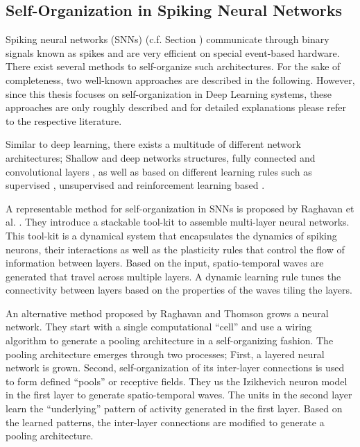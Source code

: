 \subsection{Self-Organization in Spiking Neural Networks}
Spiking neural networks (SNNs) (c.f. Section ) communicate through binary signals known as spikes and are very efficient on special event-based hardware.
There exist several methods to self-organize such architectures.
For the sake of completeness, two well-known approaches are described in the following.
However, since this thesis focuses on self-organization in Deep Learning systems, these approaches are only roughly described and for detailed explanations please refer to the respective literature.

Similar to deep learning, there exists a multitude of different network architectures; Shallow  and deep networks  structures, fully connected  and convolutional layers , as well as based on different learning rules such as supervised , unsupervised  and reinforcement learning based .

A representable method for self-organization in SNNs is proposed by Raghavan et al. .
They introduce a stackable tool-kit to assemble multi-layer neural networks.
This tool-kit is a dynamical system that encapsulates the dynamics of spiking neurons, their interactions as well as the plasticity rules that control the flow of information between layers.
Based on the input, spatio-temporal waves are generated that travel across multiple layers.
A dynamic learning rule tunes the connectivity between layers based on the properties of the waves tiling the layers.

An alternative method proposed by Raghavan and Thomson  grows a neural network.
They start with a single computational ``cell'' and use a wiring algorithm to generate a pooling architecture in a self-organizing fashion.
The pooling architecture emerges through two processes; First, a layered neural network is grown. Second, self-organization of its inter-layer connections is used to form defined ``pools'' or receptive fields.
They us the Izikhevich neuron model  in the first layer to generate spatio-temporal waves.
The units in the second layer learn the ``underlying'' pattern of activity generated in the first layer. 
Based on the learned patterns, the inter-layer connections are modified to generate a pooling architecture.

